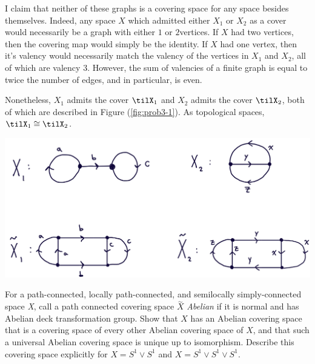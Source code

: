 \begin{homework}[e]
\begin{prf}
    I claim that neither of these graphs is a covering space for any space besides themselves. Indeed, any space $X$ which admitted either $X_1$ or $X_2$ as a cover would necessarily be a graph with either $1$ or $2$vertices. If $X$ had two vertices, then the covering map would simply be the identity. If $X$ had one vertex, then it's valency would necessarily match the valency of the vertices in $X_1$ and $X_2$, all of which are valency $3$. However, the sum of valencies of a finite graph is equal to twice the number of edges, and in particular, is even.

    Nonetheless, $X_1$ admits the cover $\tilX_1$ and $X_2$ admits the cover $\tilX_2$, both of which are described in Figure (\ref{fig:prob3-1}). As topological spaces, $\tilX_1 \cong \tilX_2$.

    \begin{center}
      \includegraphics[width=15cm]{figures/hwk6-fig3.png}
      \label{fig:prob3-1}
    \end{center}
  \end{prf}
   For a path-connected, locally path-connected, and semilocally simply-connected space \emph{X}, call a path connected covering space $\overset{\sim}{X}$ \emph{Abelian} if it is normal and has Abelian deck transformation group. Show that $X$ has an Abelian covering space that is a covering space of every other Abelian covering space of $X$, and that such a universal Abelian covering space is unique up to isomorphism. Describe this covering space explicitly for $X = S^1 \vee S^1$ and $X = S^1 \vee S^1 \vee S^1$.
  \begin{prf}

\end{prf}
\end{homework}
